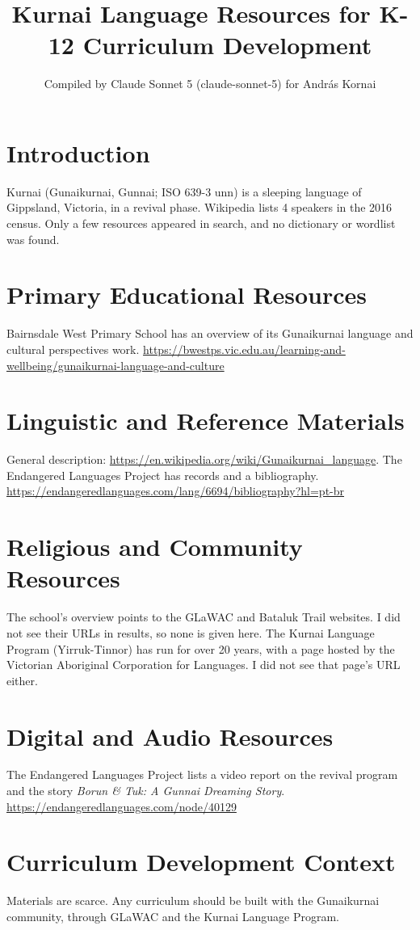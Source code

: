 \documentclass[12pt]{article}
\title{Kurnai Language Resources for K-12 Curriculum Development}
\author{Compiled by Claude Sonnet 5 (claude-sonnet-5) for Andr\'as Kornai}
\date{}
\begin{document}
\maketitle
\section{Introduction}
Kurnai (Gunaikurnai, Gunnai; ISO 639-3 unn) is a sleeping language of Gippsland, Victoria, in a revival phase. Wikipedia lists 4 speakers in the 2016 census. Only a few resources appeared in search, and no dictionary or wordlist was found.
\section{Primary Educational Resources}
Bairnsdale West Primary School has an overview of its Gunaikurnai language and cultural perspectives work. \url{https://bwestps.vic.edu.au/learning-and-wellbeing/gunaikurnai-language-and-culture}
\section{Linguistic and Reference Materials}
General description: \url{https://en.wikipedia.org/wiki/Gunaikurnai_language}. The Endangered Languages Project has records and a bibliography. \url{https://endangeredlanguages.com/lang/6694/bibliography?hl=pt-br}
\section{Religious and Community Resources}
The school's overview points to the GLaWAC and Bataluk Trail websites. I did not see their URLs in results, so none is given here. The Kurnai Language Program (Yirruk-Tinnor) has run for over 20 years, with a page hosted by the Victorian Aboriginal Corporation for Languages. I did not see that page's URL either.
\section{Digital and Audio Resources}
The Endangered Languages Project lists a video report on the revival program and the story \emph{Borun \& Tuk: A Gunnai Dreaming Story}. \url{https://endangeredlanguages.com/node/40129}
\section{Curriculum Development Context}
Materials are scarce. Any curriculum should be built with the Gunaikurnai community, through GLaWAC and the Kurnai Language Program.
\end{document}
